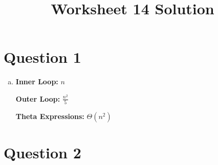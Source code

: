 \documentclass[12pt]{article}
\begin{document}
\title{Worksheet 14 Solution}
\maketitle

\section*{Question 1}
\begin{enumerate}[a.]
    \item

    \textbf{Inner Loop:} $n$

    \textbf{Outer Loop:} $\displaystyle\frac{n^2}{5}$

    \textbf{Theta Expressions:} $\Theta (n^2)$
\end{enumerate}

\section*{Question 2}
\end{document}
